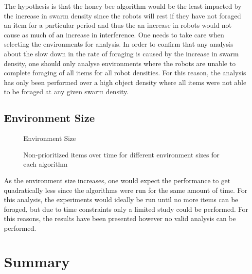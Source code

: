 The hypothesis is that the honey bee algorithm would be the least impacted by the increase in swarm density since the robots will rest if they have not foraged an item for a particular period and thus the an increase in robots would not cause as much of an increase in interference. One needs to take care when selecting the environments for analysis. In order to confirm that any analysis about the slow down in the rate of foraging is caused by the increase in swarm density, one should only analyse environments where the robots are unable to complete foraging of all items for all robot densities. For this reason, the analysis has only been performed over a high object density where all items were not able to be foraged at any given swarm density.

\subsection{Environment Size}
\label{results:environmentsize}




\begin{figure}[!htb]
\centering
\resizebox{\textwidth}{!}{}
\caption{Environment Size}
\label{sizegoldplot}
\end{figure}

\begin{figure}[!htb]
\centering
\resizebox{\textwidth}{!}{}
\caption{Non-prioritized items over time for different environment sizes for each algorithm}
\label{sizewasteplot}
\end{figure}

As the environment size increases, one would expect the performance to get quadratically less since the algorithms were run for the same amount of time. For this analysis, the experiments would ideally be run until no more items can be foraged, but due to time constraints only a limited study could be performed. For this reasons, the results have been presented however no valid analysis can be performed.

\section{Summary}
\label{results:summary}

